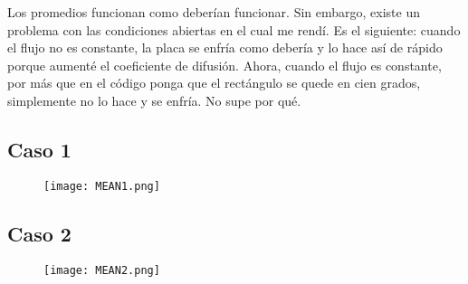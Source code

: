 \documentclass[12pt,letterpaper]{article}
\begin{document}
Los promedios funcionan como deberían funcionar. Sin embargo, existe un problema con las condiciones abiertas en el cual me rendí. Es el siguiente: cuando el flujo no es constante, la placa se enfría como debería y lo hace así de rápido porque aumenté el coeficiente de difusión. Ahora, cuando el flujo es constante, por más que en el código ponga que el rectángulo se quede en cien grados, simplemente no lo hace y se enfría. No supe por qué. 

\subsection{Caso 1}

\begin{figure}[H]
\texttt{[image: MEAN1.png]}
\centering
\end{figure}

\subsection{Caso 2}

\begin{figure}[H]
\texttt{[image: MEAN2.png]}
\centering
\end{figure}


\vspace{0.3cm}
\end{document}
